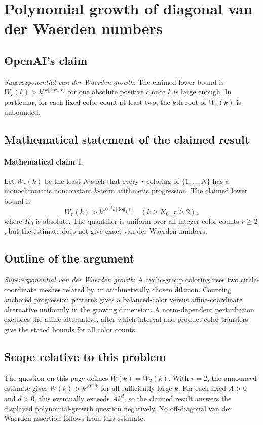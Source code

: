 \documentclass[11pt]{article}
\begin{document}
\section*{Polynomial growth of diagonal van der Waerden numbers}

\subsection{OpenAI's claim}
\textit{Superexponential van der Waerden growth}: The claimed lower bound is $W_r(k)>k^{ck\lfloor\log_2 r\rfloor}$ for one absolute positive $c$ once $k$ is large enough. In particular, for each fixed color count at least two, the $k$th root of $W_r(k)$ is unbounded.

\subsection{Mathematical statement of the claimed result}
\paragraph{Mathematical claim 1.} Let $W_r(k)$ be the least $N$ such that every $r$-coloring of $\{1,\ldots,N\}$ has a monochromatic nonconstant $k$-term arithmetic progression. The claimed lower bound is \[W_r(k)>k^{10^{-5}k\lfloor\log_2r\rfloor}\quad(k\ge K_0,\ r\ge2),\] where $K_0$ is absolute. The quantifier is uniform over all integer color counts $r\ge2$, but the estimate does not give exact van der Waerden numbers.

\subsection{Outline of the argument}
\textit{Superexponential van der Waerden growth}: A cyclic-group coloring uses two circle-coordinate meshes related by an arithmetically chosen dilation. Counting anchored progression patterns gives a balanced-color versus affine-coordinate alternative uniformly in the growing dimension. A norm-dependent perturbation excludes the affine alternative, after which interval and product-color transfers give the stated bounds for all color counts.

\subsection{Scope relative to this problem}
The question on this page defines $W(k)=W_2(k)$. With $r=2$, the announced estimate gives $W(k)>k^{10^{-5}k}$ for all sufficiently large $k$. For each fixed $A>0$ and $d>0$, this eventually exceeds $Ak^d$, so the claimed result answers the displayed polynomial-growth question negatively. No off-diagonal van der Waerden assertion follows from this estimate.
\end{document}
